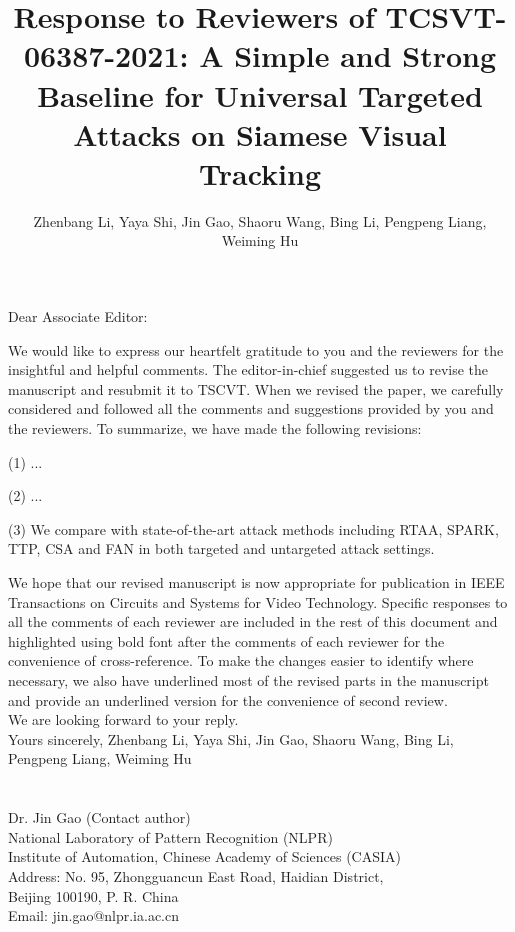 \documentclass[12pt]{article}
\begin{document}
\linespread{1}
\title{Response to Reviewers of TCSVT-06387-2021: A Simple and Strong Baseline for Universal Targeted Attacks on Siamese Visual Tracking}
\author{\normalsize{Zhenbang Li, Yaya Shi, Jin Gao, Shaoru Wang, Bing Li, Pengpeng Liang, Weiming Hu}}
\date{}
\maketitle

\noindent Dear Associate Editor:

We would like to express our heartfelt gratitude to you and the reviewers for the insightful and helpful comments. 
The editor-in-chief suggested us to revise the manuscript and resubmit it to TSCVT.
When we revised the paper, we carefully considered and followed all the comments and suggestions provided by you and the reviewers. To summarize, we have made the following revisions:

(1) ...

(2) ...

(3) We compare with state-of-the-art attack methods including RTAA, SPARK, TTP, CSA and FAN in both targeted and untargeted attack settings.

We hope that our revised manuscript is now appropriate for publication in IEEE Transactions on Circuits and Systems for Video Technology. Specific responses to all the comments of each reviewer are included in the rest of this document and highlighted using bold font after the comments of each reviewer for the convenience of cross-reference. To make the changes easier to identify where necessary, we also have underlined most of the revised parts in the manuscript and provide an underlined version for the convenience of second review.\\[10pt]
\indent We are looking forward to your reply.\\[10pt]
\noindent Yours sincerely,
\noindent Zhenbang Li, Yaya Shi, Jin Gao, Shaoru Wang, Bing Li, Pengpeng Liang, Weiming Hu
\\
\\
\\
\noindent Dr. Jin Gao (Contact author)\\
\noindent National Laboratory of Pattern Recognition (NLPR)\\
\noindent Institute of Automation, Chinese Academy of Sciences (CASIA)\\
\noindent Address: No. 95, Zhongguancun East Road, Haidian District,\\
\noindent Beijing 100190, P. R. China\\
\noindent Email: jin.gao@nlpr.ia.ac.cn
\end{document}
